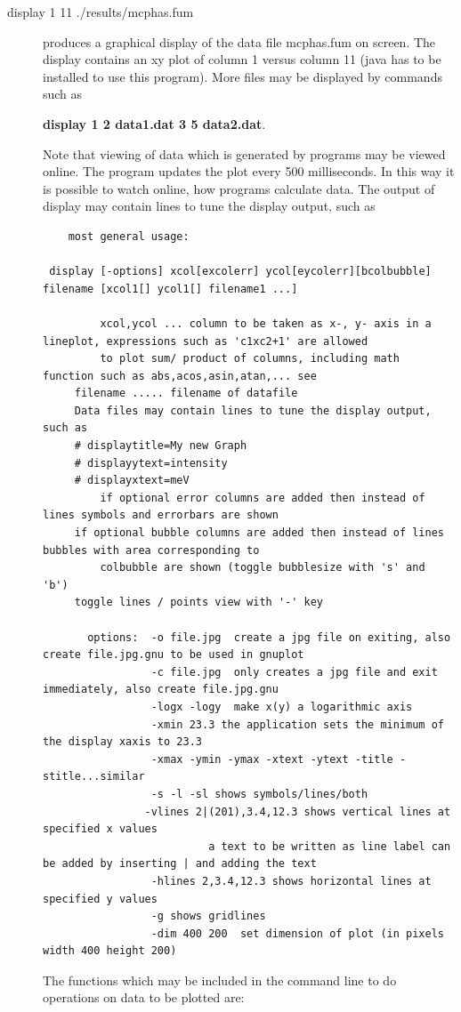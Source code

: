 \begin{description} 
\item [display 1 11 ./results/mcphas.fum] produces a graphical display of the data %
file
mcphas.fum on screen. The display contains an xy plot of column 1 versus column 11
({\prg java} has to be installed to use this program). 
More files may be displayed by commands such as

{\bf display 1 2 data1.dat 3 5 data2.dat}.

Note that viewing of 
data which is generated by programs may be viewed online. The program updates the plot
every 500 milliseconds. In this way it is possible to watch online, how programs
calculate data. The output of display may contain lines to tune the display output, %
such as
\begin{verbatim}
	most general usage: 

 display [-options] xcol[excolerr] ycol[eycolerr][bcolbubble] filename [xcol1[] ycol1[] filename1 ...]

         xcol,ycol ... column to be taken as x-, y- axis in a lineplot, expressions such as 'c1xc2+1' are allowed
         to plot sum/ product of columns, including math function such as abs,acos,asin,atan,... see 
	 filename ..... filename of datafile
	 Data files may contain lines to tune the display output, such as
	 # displaytitle=My new Graph
	 # displayytext=intensity
	 # displayxtext=meV 
         if optional error columns are added then instead of lines symbols and errorbars are shown
	 if optional bubble columns are added then instead of lines bubbles with area corresponding to
	     colbubble are shown (toggle bubblesize with 's' and 'b')
	 toggle lines / points view with '-' key
         
       options:  -o file.jpg  create a jpg file on exiting, also create file.jpg.gnu to be used in gnuplot
                 -c file.jpg  only creates a jpg file and exit immediately, also create file.jpg.gnu 
                 -logx -logy  make x(y) a logarithmic axis
                 -xmin 23.3 the application sets the minimum of the display xaxis to 23.3
                 -xmax -ymin -ymax -xtext -ytext -title -stitle...similar
                 -s -l -sl shows symbols/lines/both
                -vlines 2|(201),3.4,12.3 shows vertical lines at specified x values
                          a text to be written as line label can be added by inserting | and adding the text
                 -hlines 2,3.4,12.3 shows horizontal lines at specified y values
                 -g shows gridlines
                 -dim 400 200  set dimension of plot (in pixels width 400 height 200)
\end{verbatim} 
The functions which may be included in the command line to do operations on data to be 
plotted are:


\end{description}
